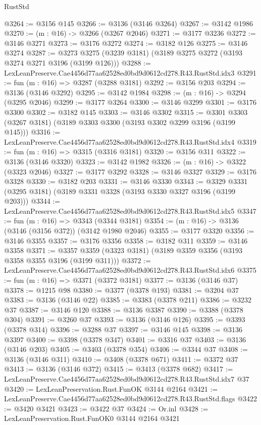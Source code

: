 \begin{lexlean}{RustStd}
\begin{coremodule}
@3264 := @3156 @145
@3266 := @3136 (@3146 @3264)
@3267 := @3142 @1986
@3270 := (m : @16) -> @3266 (@3267 @2046)
@3271 := @3177 @3236
@3272 := @3146 @3271
@3273 := @3176 @3272
@3274 := @3182 @126
@3275 := @3146 @3274
@3287 := @3273 @3275 (@3239 @3181) (@3189 @3275 @3272 (@3193 @3274 @3271 @3196 (@3199 @126)))
@3288 := LexLeanPreserve.Cae4456d77aa62528ed0bd9d0612cd278.R43.RustStd.idx3
@3291 := fun (m : @16) => @3287 (@3288 @3181)
@3292 := @3156 @203
@3294 := @3136 (@3146 @3292)
@3295 := @3142 @1984
@3298 := (m : @16) -> @3294 (@3295 @2046)
@3299 := @3177 @3264
@3300 := @3146 @3299
@3301 := @3176 @3300
@3302 := @3182 @145
@3303 := @3146 @3302
@3315 := @3301 @3303 (@3267 @3181) (@3189 @3303 @3300 (@3193 @3302 @3299 @3196 (@3199 @145)))
@3316 := LexLeanPreserve.Cae4456d77aa62528ed0bd9d0612cd278.R43.RustStd.idx4
@3319 := fun (m : @16) => @3315 (@3316 @3181)
@3320 := @3156 @311
@3322 := @3136 (@3146 @3320)
@3323 := @3142 @1982
@3326 := (m : @16) -> @3322 (@3323 @2046)
@3327 := @3177 @3292
@3328 := @3146 @3327
@3329 := @3176 @3328
@3330 := @3182 @203
@3331 := @3146 @3330
@3343 := @3329 @3331 (@3295 @3181) (@3189 @3331 @3328 (@3193 @3330 @3327 @3196 (@3199 @203)))
@3344 := LexLeanPreserve.Cae4456d77aa62528ed0bd9d0612cd278.R43.RustStd.idx5
@3347 := fun (m : @16) => @3343 (@3344 @3181)
@3354 := (m : @16) -> @3136 (@3146 (@3156 @372)) (@3142 @1980 @2046)
@3355 := @3177 @3320
@3356 := @3146 @3355
@3357 := @3176 @3356
@3358 := @3182 @311
@3359 := @3146 @3358
@3371 := @3357 @3359 (@3323 @3181) (@3189 @3359 @3356 (@3193 @3358 @3355 @3196 (@3199 @311)))
@3372 := LexLeanPreserve.Cae4456d77aa62528ed0bd9d0612cd278.R43.RustStd.idx6
@3375 := fun (m : @16) => @3371 (@3372 @3181)
@3377 := @3136 (@3146 @37)
@3378 := @1215 @98
@3380 := @3377 (@3378 @193)
@3381 := @3204 @37
@3383 := @3136 (@3146 @22)
@3385 := @3383 (@3378 @211)
@3386 := @3232 @37
@3387 := @3146 @120
@3388 := @3136 @3387
@3390 := @3388 (@3378 @304)
@3391 := @3260 @37
@3393 := @3136 (@3146 @126)
@3395 := @3393 (@3378 @314)
@3396 := @3288 @37
@3397 := @3146 @145
@3398 := @3136 @3397
@3400 := @3398 (@3378 @347)
@3401 := @3316 @37
@3403 := @3136 (@3146 @203)
@3405 := @3403 (@3378 @354)
@3406 := @3344 @37
@3408 := @3136 (@3146 @311)
@3410 := @3408 (@3378 @671)
@3411 := @3372 @37
@3413 := @3136 (@3146 @372)
@3415 := @3413 (@3378 @682)
@3417 := LexLeanPreserve.Cae4456d77aa62528ed0bd9d0612cd278.R43.RustStd.idx7 @37
@3420 := LexLeanPreservation.Rust.FunOK @3144 @2164
@3421 := LexLeanPreserve.Cae4456d77aa62528ed0bd9d0612cd278.R43.RustStd.flags
@3422 := @3420 @3421
@3423 := @3422 @37
@3424 := Or.inl
@3428 := LexLeanPreservation.Rust.FunOK0 @3144 @2164 @3421

\end{coremodule}
\end{lexlean}

